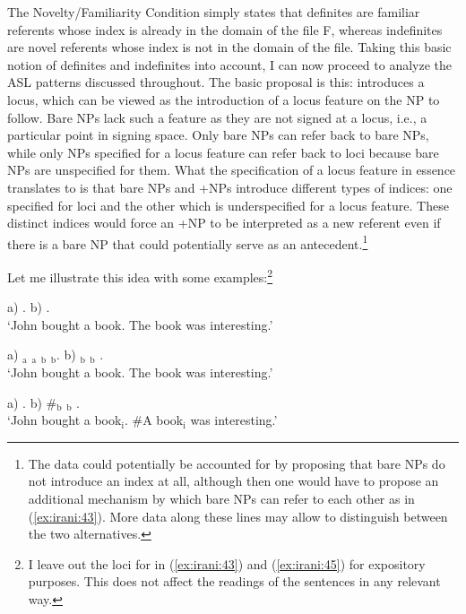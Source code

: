 \documentclass[output=paper,
modfonts
]{langscibook}
\begin{document}
The Novelty/Familiarity Condition simply states that definites are familiar referents whose index is already in the domain of the file F, whereas indefinites are novel referents whose index is not in the domain of the file. Taking this basic notion of definites and indefinites into account, I can now proceed to analyze the ASL patterns discussed throughout. The basic proposal is this:  introduces a locus, which can be viewed as the introduction of a locus feature on the NP to follow. Bare NPs lack such a feature as they are not signed at a locus, i.e., a particular point in signing space. Only bare NPs can refer back to bare NPs, while only NPs specified for a locus feature can refer back to loci because bare NPs are unspecified for them. What the specification of a locus feature in essence translates to is that bare NPs and +NPs introduce different types of indices: one specified for loci and the other which is underspecified for a locus feature. These distinct indices would force an +NP to be interpreted as a new referent even if there is a bare NP that could potentially serve as an antecedent.\footnote{The data could potentially be accounted for by proposing that bare NPs do not introduce an index at all, although then one would have to propose an additional mechanism by which bare NPs can refer to each other as in (\ref{ex:irani:43}). More data along these lines may allow to distinguish between the two alternatives.} 

Let me illustrate this idea with some examples:\footnote{I leave out the loci for  in (\ref{ex:irani:43}) and (\ref{ex:irani:45}) for expository purposes. This does not affect the readings of the sentences in any relevant way.} 

\begin{exe}
\ex \label{ex:irani:43} a) . b) . \\
`John bought a book. The book was interesting.'

\ex \label{ex:irani:44} a) $_\text{a}$ $_\text{a}$  $_\text{b}$ $_\text{b}$. b) $_\text{b}$ $_\text{b}$ . \\
`John bought a book. The book was interesting.'

\ex \label{ex:irani:45} a) . b) \#$_\text{b}$ $_\text{b}$ . \\
`John bought a book$_\text{i}$. \#A book$_\text{i}$ was interesting.'  
\end{exe}
\end{document}
